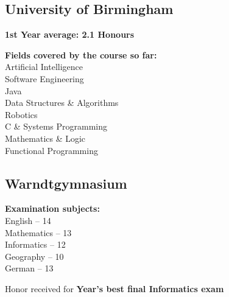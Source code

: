 \documentclass[]{jonas-cv}
\begin{document}
\begin{minipage}[t]{0.34\textwidth} 


\tinysectionsep
\subsection{University of Birmingham}
\sectionsep

\begin{tightemize}
    \item \textbf{1st Year average: 2.1 Honours}
    \item \textbf{Fields covered by the course so far:}\\
    Artificial Intelligence \\
    Software Engineering \\
    Java \\
    Data Structures \& Algorithms \\
    Robotics \\
    C \& Systems Programming \\
    Mathematics \& Logic \\
    Functional Programming
\end{tightemize}
\largesectionsep


\subsection{Warndtgymnasium}

\begin{tightemize}
    \item \textbf{Examination subjects:}\\
             English -- 14 \\
             Mathematics -- 13\\
             Informatics -- 12\\
             Geography -- 10\\
             German -- 13
    \item Honor received for \textbf{Year's best final Informatics exam}
\end{tightemize}
\largesectionsep



\end{minipage}
\end{document}
